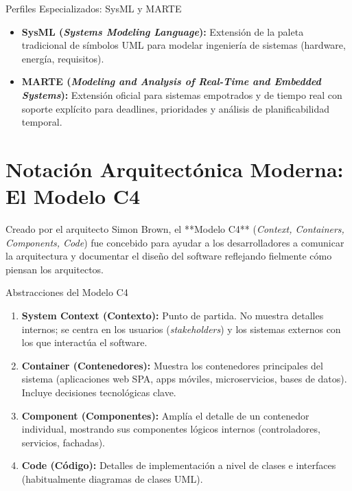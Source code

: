 \begin{importante}{Perfiles Especializados: SysML y MARTE}
\begin{itemize}[leftmargin=1.5em]
  \item \textbf{SysML (\emph{Systems Modeling Language}):} Extensión de la paleta tradicional de símbolos UML para modelar ingeniería de sistemas (hardware, energía, requisitos).
  \item \textbf{MARTE (\emph{Modeling and Analysis of Real-Time and Embedded Systems}):} Extensión oficial para sistemas empotrados y de tiempo real con soporte explícito para deadlines, prioridades y análisis de planificabilidad temporal.
\end{itemize}
\end{importante}

\section{Notación Arquitectónica Moderna: El Modelo C4}
\label{sec:modelo-c4}

Creado por el arquitecto Simon Brown, el **Modelo C4** (\emph{Context, Containers, Components, Code}) fue concebido para ayudar a los desarrolladores a comunicar la arquitectura y documentar el diseño del software reflejando fielmente cómo piensan los arquitectos.

\begin{definicion}{Abstracciones del Modelo C4}
\begin{enumerate}[leftmargin=1.5em]
  \item \textbf{System Context (Contexto):} Punto de partida. No muestra detalles internos; se centra en los usuarios (\emph{stakeholders}) y los sistemas externos con los que interactúa el software.
  \item \textbf{Container (Contenedores):} Muestra los contenedores principales del sistema (aplicaciones web SPA, apps móviles, microservicios, bases de datos). Incluye decisiones tecnológicas clave.
  \item \textbf{Component (Componentes):} Amplía el detalle de un contenedor individual, mostrando sus componentes lógicos internos (controladores, servicios, fachadas).
  \item \textbf{Code (Código):} Detalles de implementación a nivel de clases e interfaces (habitualmente diagramas de clases UML).
\end{enumerate}
\end{definicion}

